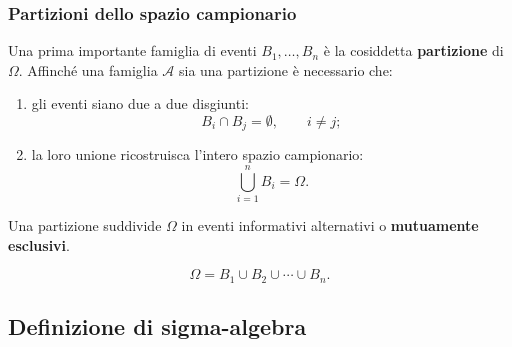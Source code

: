 \documentclass[handout]{beamer}%
\newenvironment{stepenumerate}{\begin{enumerate}[<+->]}{\end{enumerate}}
\providecommand{\1}{\mathbf{1}}
\providecommand{\QTR}[2]{\csname #1\endcsname{#2}}
\begin{document}
\begin{frame}%
%

\frametitle{Partizioni dello spazio campionario}%


Una prima importante famiglia di eventi $B_{1},\ldots,B_{n}$ \`{e} la
cosiddetta \textbf{partizione} di $\Omega$. Affinch\'{e} una famiglia
$\mathcal{A}$ sia una partizione \`{e} necessario che:

\medskip

\begin{stepenumerate}
\item[1.] gli eventi siano due a due disgiunti:
\[
B_{i}\cap B_{j}=\emptyset,\qquad i\neq j;
\]


\item[2.] la loro unione ricostruisca l'intero spazio campionario:
\[
\bigcup_{i=1}^{n}B_{i}=\Omega.
\]

\end{stepenumerate}

Una partizione suddivide $\Omega$ in eventi informativi alternativi o
\textbf{mutuamente esclusivi}.%

\[
\Omega= B_{1}\cup B_{2}\cup\cdots\cup B_{n}.
\]
%

\transboxout
\end{frame}%




\subsection{Definizione di sigma-algebra}%
\end{document}
